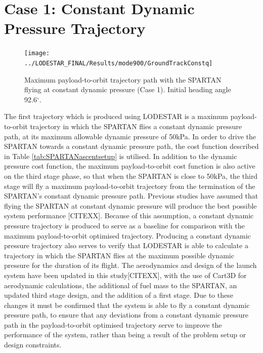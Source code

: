 \section{Case 1: Constant Dynamic Pressure Trajectory}
\begin{figure}[ht]
	\centering
	\texttt{[image: ../LODESTAR\_FINAL/Results/mode900/GroundTrackConstq]}
	\caption{Maximum payload-to-orbit trajectory path with the SPARTAN flying at constant dynamic pressure (Case 1). Initial heading angle 92.6$^\circ$.}
	\label{fig:GroundTrackConstq}
\end{figure}

The first trajectory which is produced using LODESTAR is a maximum payload-to-orbit trajectory in which the SPARTAN flies a constant dynamic pressure path, at its maximum allowable dynamic pressure of 50kPa. In order to drive the SPARTAN towards a constant dynamic pressure path, the cost function described in Table \ref{tab:SPARTANascentsetup} is utilised. In addition to the dynamic pressure cost function, the maximum payload-to-orbit cost function is also active on the third stage phase, so that when the SPARTAN is close to 50kPa, the third stage will fly a maximum payload-to-orbit trajectory from the termination of the SPARTAN's constant dynamic pressure path.
Previous studies have assumed that flying the SPARTAN at constant dynamic pressure will produce the best possible system performance [CITEXX]. Because of this assumption, a constant dynamic pressure trajectory is produced to serve as a baseline for comparison with the maximum payload-to-orbit optimised trajectory. Producing a constant dynamic pressure trajectory also serves to verify that LODESTAR is able to calculate a trajectory in which the SPARTAN flies at the maximum possible dynamic pressure for the duration of its flight. 
The aerodynamics and design of the launch system have been updated in this study[CITEXX], with the use of Cart3D for aerodynamic calculations, the additional of fuel mass to the SPARTAN, an updated third stage design, and the addition of a first stage. Due to these changes it must be confirmed that the system is able to fly a constant dynamic pressure path, to ensure that any deviations from a constant dynamic pressure path in the payload-to-orbit optimised trajectory serve to improve the performance of the system, rather than being a result of the problem setup or design constraints. 

